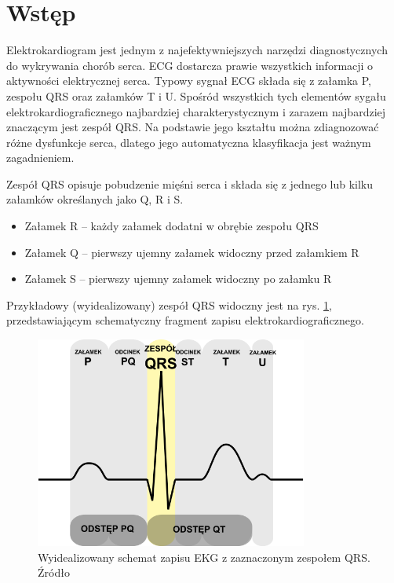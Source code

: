 \section{Wstęp}

\qquad Elektrokardiogram jest jednym z najefektywniejszych narzędzi diagnostycznych do wykrywania chorób serca. ECG dostarcza prawie wszystkich informacji o aktywności elektrycznej serca. Typowy sygnał ECG składa się z załamka P, zespołu QRS oraz załamków T i U. Spośród wszystkich tych elementów sygału elektrokardiograficznego najbardziej charakterystycznym i zarazem najbardziej znaczącym jest zespół QRS. Na podstawie jego kształtu można zdiagnozować różne dysfunkcje serca, dlatego jego automatyczna klasyfikacja jest ważnym zagadnieniem.

\qquad Zespół QRS opisuje pobudzenie mięśni serca i składa się z jednego lub kilku załamków określanych jako Q, R i S.
\begin{itemize}
	\item Załamek R – każdy załamek dodatni w obrębie zespołu QRS
	\item Załamek Q – pierwszy ujemny załamek widoczny przed załamkiem R
	\item Załamek S – pierwszy ujemny załamek widoczny po załamku R
\end{itemize}

Przykładowy (wyidealizowany) zespół QRS widoczny jest na rys. \ref{fig:QRSComplex}, przedstawiającym schematyczny fragment zapisu elektrokardiograficznego.


\begin{figure}[h]
	\centering
	\includegraphics[width=0.8\textwidth]{Grafika/ZespolQRS}
	\caption{Wyidealizowany schemat zapisu EKG z zaznaczonym zespołem QRS. Źródło  \cite{QRSComplexWiki}}
	\label{fig:QRSComplex}
\end{figure}

